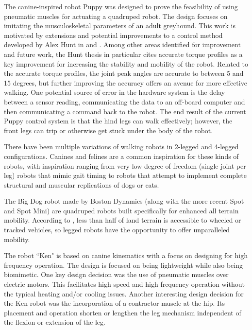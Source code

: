 
The canine-inspired robot Puppy was designed to prove the feasibility of using
pneumatic muscles for actuating a quadruped robot. The design focuses on 
imitating the musculoskeletal parameters of an adult greyhound. 
\cite{PuppyDesign} This work is motivated by extensions and potential
improvements to a control method developed by Alex Hunt in
\cite{HuntPhDThesis} and \cite{HuntHindLegWalking}. Among other areas identified
for improvement and future work, the Hunt thesis in particular cites accurate torque
profiles as a key improvement for increasing the stability and mobility of the
robot. Related to the accurate torque profiles, the joint peak angles are
accurate to between 5 and 15 degrees, but further improving the accuracy offers
an avenue for more effective walking. One potential source of error in the
hardware system is the delay between a sensor reading, communicating the data to
an off-board computer and then communicating a command back to the robot. The end
result of the current Puppy control system is that the hind legs can walk effectively;
however, the front legs can trip or otherwise get stuck under the body of the
robot.


There have been multiple variations of walking robots in 2-legged and 4-legged
configurations. Canines and felines are a common inspiration for these kinds of
robots, with inspiration ranging from very low degree of freedom (single joint
per leg) robots that mimic gait timing to robots that attempt to implement
complete structural and muscular replications of dogs or cats.


The Big Dog robot made by Boston Dynamics (along with the more recent Spot and
Spot Mini) are quadruped robots built specifically for enhanced all terrain
mobility. According to \cite{BigDog}, less than half of land terrain is
accessible to wheeled or tracked vehicles, so legged robots have the opportunity
to offer unparalleled mobility.

The robot ``Ken" is based on canine kinematics with a focus on designing for
high frequency operation. The design is focused on being lightweight while also
being biomimetic. One key design decision was the use of pneumatic muscles over
electric motors. This facilitates high speed and high frequency operation
without the typical heating and/or cooling issues. Another interesting design
decision for the Ken robot was the incorporation of a contractor muscle at the
hip. Its placement and operation shorten or lengthen the leg mechanism
independent of the flexion or extension of the leg.
\cite{Narioka2012}

